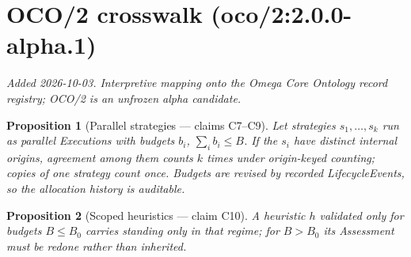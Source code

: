 \documentclass{article}
\newtheorem{proposition}{Proposition}
\begin{document}
\section{OCO/2 crosswalk (oco/2:2.0.0-alpha.1)}
\emph{Added 2026-10-03. Interpretive mapping onto the Omega Core Ontology
record registry; OCO/2 is an unfrozen alpha candidate.}

\begin{proposition}[Parallel strategies --- claims C7--C9]
Let strategies $s_1,\dots,s_k$ run as parallel Executions with budgets $b_i$, $\sum_i b_i\le B$. If the $s_i$ have distinct internal origins, agreement among them counts $k$ times under origin-keyed counting; copies of one strategy count once. Budgets are revised by recorded LifecycleEvents, so the allocation history is auditable.
\end{proposition}

\begin{proposition}[Scoped heuristics --- claim C10]
A heuristic $h$ validated only for budgets $B\le B_0$ carries standing only in that regime; for $B>B_0$ its Assessment must be redone rather than inherited.
\end{proposition}
\end{document}

